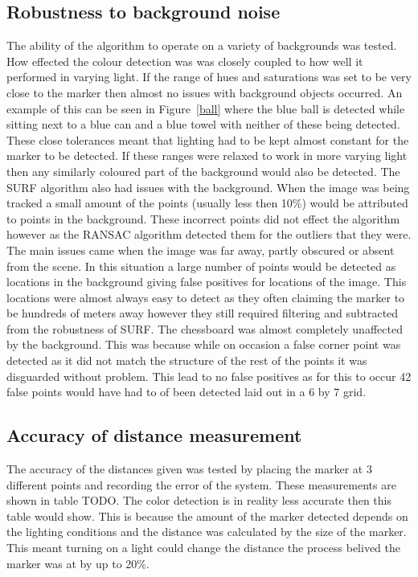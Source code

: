 \subsection{Robustness to background noise}
The ability of the algorithm to operate on a variety of backgrounds was tested. How effected the colour detection was was closely coupled to how well it performed in varying light. If the range of hues and saturations was set to be very close to the marker then almost no issues with background objects occurred. An example of this can be seen in Figure~\ref{ball} where the blue ball is detected while sitting next to a blue can and a blue towel with neither of these being detected. These close tolerances meant that lighting had to be kept almost constant for the marker to be detected. If these ranges were relaxed to work in more varying light then any similarly coloured part of the background would also be detected. The SURF algorithm also had issues with the background. When the image was being tracked a small amount of the points (usually less then 10\%) would be attributed to points in the background. These incorrect points did not effect the algorithm however as the RANSAC algorithm detected them for the outliers that they were. The main issues came when the image was far away, partly obscured or absent from the scene. In this situation a large number of points would be detected as locations in the background giving false positives for locations of the image. This locations were almost always easy to detect as they often claiming the marker to be hundreds of meters away however they still required filtering and subtracted from the robustness of SURF. The chessboard was almost completely unaffected by the background. This was because while on occasion a false corner point was detected as it did not match the structure of the rest of the points it was disguarded without problem. This lead to no false positives as for this to occur 42 false points would have had to of been detected laid out in a 6 by 7 grid.

\subsection{Accuracy of distance measurement}
The accuracy of the distances given was tested by placing the marker at 3 different points and recording the error of the system. These measurements are shown in table TODO. The color detection is in reality less accurate then this table would show. This is because the amount of the marker detected depends on the lighting conditions and the distance was calculated by the size of the marker. This meant turning on a light could change the distance the process belived the marker was at by up to 20\%.

